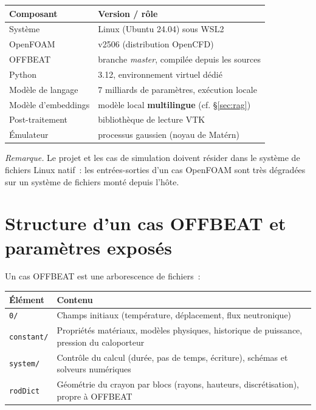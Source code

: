 \documentclass[12pt,a4paper,french]{report}
\begin{document}
\noindent
\begin{tabularx}{\textwidth}{@{}lX@{}}
\toprule
\textbf{Composant} & \textbf{Version / rôle}\\
\midrule
Système & Linux (Ubuntu 24.04) sous WSL2\\
OpenFOAM & v2506 (distribution OpenCFD)\\
OFFBEAT & branche \textit{master}, compilée depuis les sources\\
Python & 3.12, environnement virtuel dédié\\
Modèle de langage & \num{7} milliards de paramètres, exécution locale\\
Modèle d'embeddings & modèle local \textbf{multilingue} (cf. §\ref{sec:rag})\\
Post-traitement & bibliothèque de lecture VTK\\
Émulateur & processus gaussien (noyau de Matérn)\\
\bottomrule
\end{tabularx}

\vspace{0.5cm}

\noindent
\textit{Remarque.} Le projet et les cas de simulation doivent résider dans le
système de fichiers Linux natif~: les entrées-sorties d'un cas OpenFOAM sont
très dégradées sur un système de fichiers monté depuis l'hôte.

\section{Structure d'un cas OFFBEAT et paramètres exposés}
\label{ann:cas}

\noindent Un cas OFFBEAT est une arborescence de fichiers~:

\vspace{0.3cm}
\noindent
\begin{tabularx}{\textwidth}{@{}lX@{}}
\toprule
\textbf{Élément} & \textbf{Contenu}\\
\midrule
\texttt{0/} & Champs initiaux (température, déplacement, flux neutronique)\\
\texttt{constant/} & Propriétés matériaux, modèles physiques, historique de
  puissance, pression du caloporteur\\
\texttt{system/} & Contrôle du calcul (durée, pas de temps, écriture),
  schémas et solveurs numériques\\
\texttt{rodDict} & Géométrie du crayon par blocs (rayons, hauteurs,
  discrétisation), propre à OFFBEAT\\
\bottomrule
\end{tabularx}
\end{document}
